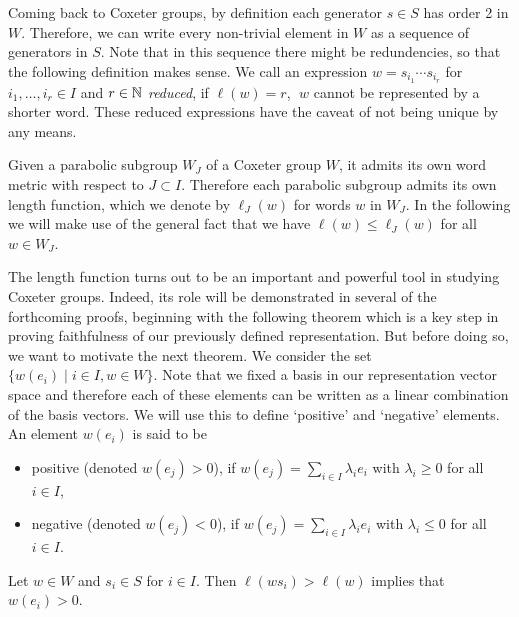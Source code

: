 Coming back to Coxeter groups, by definition each generator \(s\in S\) has order 2 in \(W\).
Therefore, we can write every non-trivial element in \(W\) as a sequence of generators in \(S\).
Note that in this sequence there might be redundencies, so that the following definition makes sense.
We call an expression \(w = s_{i_1} \cdots s_{i_r}\) for \(i_1,\ldots, i_r\in I\) and \(r\in\mathbb{N}\) \emph{reduced}, if \(\ell(w) = r\), \ie \(\;w\) cannot be represented by a shorter word.
These reduced expressions have the caveat of not being unique by any means.

Given a parabolic subgroup \(W_J\) of a Coxeter group \(W\), it admits its own word metric with respect to \(J\subset I\).
Therefore each parabolic subgroup admits its own length function, which we denote by \(\ell_J(w)\) for words \(w\) in \(W_J\).
In the following we will make use of the general fact that we have \(\ell(w) \leq \ell_J(w)\) for all \(w\in W_J\).

The length function turns out to be an important and powerful tool in studying Coxeter groups.
Indeed, its role will be demonstrated in several of the forthcoming proofs, beginning with the following theorem which is a key step in proving faithfulness of our previously defined representation.
But before doing so, we want to motivate the next theorem. %
We consider the set \(\{w(e_i) \;\vert\; i \in I, w \in W\}\).
Note that we fixed a basis in our representation vector space and therefore each of these elements can be written as a linear combination of the basis vectors.
We will use this to define `positive' and `negative' elements.
An element \(w(e_i)\) is said to be
\begin{itemize}
    \item positive (denoted \(w(e_j) > 0\)), if \(w(e_j) = \sum_{i \in I} \lambda_i e_i\) with \(\lambda_i \geq 0\) for all \(i \in I\),
    \item negative (denoted \(w(e_j) < 0\)), if \(w(e_j) = \sum_{i \in I} \lambda_i e_i\) with \(\lambda_i \leq 0\) for all \(i \in I\).
\end{itemize}

\begin{theorem}\label{thm:action}
    Let \(w\in W\) and \(s_i\in S\) for \(i\in I\).
    Then \(\ell(ws_i) > \ell(w)\) implies that \(w(e_i) > 0\).
\end{theorem}


